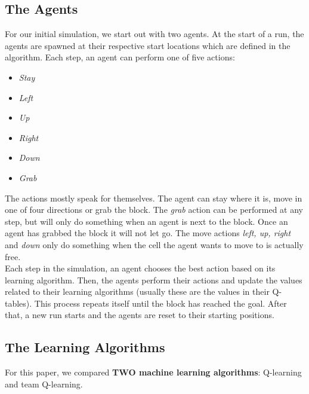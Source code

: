 \subsection{The Agents}
For our initial simulation, we start out with two agents. At the start of a run, the agents are spawned at their respective start locations which are defined in the algorithm. Each step, an agent can perform one of five actions:
\begin{itemize}
\item \textit{Stay}
\item \textit{Left}
\item \textit{Up}
\item \textit{Right}
\item \textit{Down}
\item \textit{Grab}
\end{itemize}
The actions mostly speak for themselves. The agent can stay where it is, move in one of four directions or grab the block. The \textit{grab} action can be performed at any step, but will only do something when an agent is next to the block. Once an agent has grabbed the block it will not let go. The move actions \textit{left, up, right} and \textit{down} only do something when the cell the agent wants to move to is actually free.\\
Each step in the simulation, an agent chooses the best action based on its learning algorithm. Then, the agents perform their actions and update the values related to their learning algorithms (usually these are the values in their Q-tables). This process repeats itself until the block has reached the goal. After that, a new run starts and the agents are reset to their starting positions.
\subsection{The Learning Algorithms}
For this paper, we compared \textbf{TWO machine learning algorithms}: Q-learning and team Q-learning.